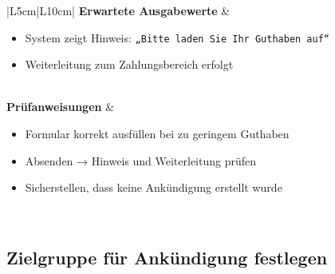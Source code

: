 \documentclass[a4paper,12pt]{article}
\begin{document}
\begin{longtable}{|L{5cm}|L{10cm}|}
\hline
\textbf{Erwartete Ausgabewerte} &
\begin{minipage}[t]{\linewidth}
\vspace{0.5em}
\begin{itemize}[leftmargin=*]
  \item System zeigt Hinweis: \texttt{„Bitte laden Sie Ihr Guthaben auf“}
  \item Weiterleitung zum Zahlungsbereich erfolgt
\end{itemize}
\vspace{0.5em}
\end{minipage} \\
\hline
\textbf{Prüfanweisungen} &
\begin{minipage}[t]{\linewidth}
\vspace{0.5em}
\begin{itemize}[leftmargin=*]
  \item Formular korrekt ausfüllen bei zu geringem Guthaben
  \item Absenden → Hinweis und Weiterleitung prüfen
  \item Sicherstellen, dass keine Ankündigung erstellt wurde
\end{itemize}
\vspace{0.5em}
\end{minipage} \\
\hline
\end{longtable}


\subsection{Zielgruppe für Ankündigung festlegen}
\end{document}
